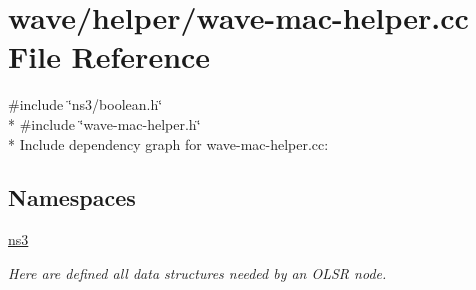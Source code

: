 \hypertarget{wave-mac-helper_8cc}{}\section{wave/helper/wave-\/mac-\/helper.cc File Reference}
\label{wave-mac-helper_8cc}
{\ttfamily \#include \char`\"{}ns3/boolean.\+h\char`\"{}}\\*
{\ttfamily \#include \char`\"{}wave-\/mac-\/helper.\+h\char`\"{}}\\*
Include dependency graph for wave-\/mac-\/helper.cc\+:
\subsection*{Namespaces}
\begin{DoxyCompactItemize}
\item 
 \hyperlink{namespacens3}{ns3}
\begin{DoxyCompactList}\small\item\em Here are defined all data structures needed by an O\+L\+SR node. \end{DoxyCompactList}\end{DoxyCompactItemize}
